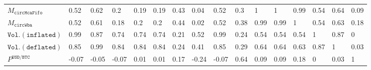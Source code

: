 \begin{tabular}{llllllllllllllll}
  $M_{\mathtt{circMcaFifo}}$ & 0.52 & 0.62 & 0.2 & 0.19 & 0.19 & 0.43 & 0.04 & 0.52 & 0.3 & 1 & 1 & 0.99 & 0.54 & 0.64 & 0.09 \\ 
  $M_{\mathtt{circWba}}$ & 0.52 & 0.61 & 0.18 & 0.2 & 0.2 & 0.44 & 0.02 & 0.52 & 0.38 & 0.99 & 0.99 & 1 & 0.54 & 0.63 & 0.18 \\ 
  $\mathtt{Vol.(inflated)}$ & 0.99 & 0.87 & 0.74 & 0.74 & 0.74 & 0.21 & 0.52 & 0.99 & 0.24 & 0.54 & 0.54 & 0.54 & 1 & 0.87 & 0 \\ 
  $\mathtt{Vol.(deflated)}$ & 0.85 & 0.99 & 0.84 & 0.84 & 0.84 & 0.24 & 0.41 & 0.85 & 0.29 & 0.64 & 0.64 & 0.63 & 0.87 & 1 & 0.03 \\ 
  $P^{\mathtt{USD}/\mathtt{BTC}}$ & -0.07 & -0.05 & -0.07 & 0.01 & 0.01 & 0.17 & -0.24 & -0.07 & 0.64 & 0.09 & 0.09 & 0.18 & 0 & 0.03 & 1 \\ 
  \end{tabular}
